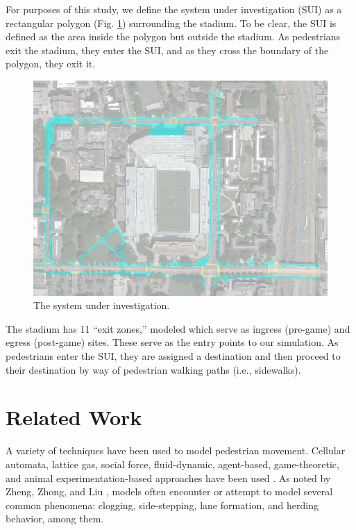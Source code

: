 \documentclass[12pt]{article}
\begin{document}
For purposes of this study, we define the system under investigation (SUI) as a
rectangular polygon (Fig. \ref{fig:polygon}) surrounding the stadium. To be
clear, the SUI is defined as the area inside the polygon but outside the
stadium. As pedestrians exit the stadium, they enter the SUI, and as they cross
the boundary of the polygon, they exit it.

\begin{figure}[H]
  \includegraphics[width=\linewidth,natwidth=1026,natheight=750]{GATechMap_20160301.png}
  \caption{The system under investigation.}
  \label{fig:polygon}
\end{figure}

The stadium has 11 ``exit zones,'' modeled which serve as ingress (pre-game) and egress
(post-game) sites. These serve as the entry points to our simulation. As
pedestrians enter the SUI, they are assigned a destination and then proceed
to their destination by way of pedestrian walking paths (i.e., sidewalks).

\section{Related Work}
\label{sec:literature}

A variety of techniques have been used to model pedestrian movement. Cellular
automata, lattice gas, social force, fluid-dynamic, agent-based, game-theoretic,
and animal experimentation-based approaches have been used
\cite{zheng2009modeling}. As noted by Zheng, Zhong, and Liu
\cite{zheng2009modeling}, models often encounter or attempt to model several
common phenomena: clogging, side-stepping, lane formation, and herding
behavior, among them.
\end{document}
